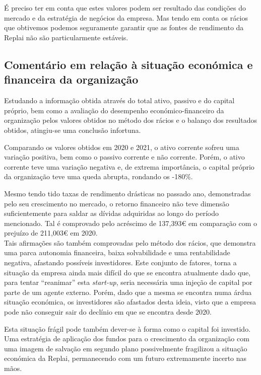 \hrulefill
\\~\\

É preciso ter em conta que estes valores podem ser resultado das condições do mercado e da estratégia de negócios da empresa. Mas tendo em conta os rácios que obtivemos podemos seguramente garantir que as fontes de rendimento da Replai não são particularmente estáveis.

\newpage
\subsection{Comentário em relação à situação económica e financeira da organização}

Estudando a informação obtida através do total ativo, passivo e do capital próprio, bem como a avaliação do desempenho económico-financeiro da organização pelos valores obtidos no método dos rácios e o balanço dos resultados obtidos, atingiu-se uma conclusão infortuna.

Comparando os valores obtidos em 2020 e 2021, o ativo corrente sofreu uma variação positiva, bem como o passivo corrente e não corrente. Porém, o ativo corrente teve uma variação negativa e, de extrema importância, o capital próprio da organização teve uma queda abrupta, rondando os -180\%.

Mesmo tendo tido taxas de rendimento drásticas no passado ano, demonstradas pelo seu crescimento no mercado, o retorno financeiro não teve dimensão suficientemente para saldar as dívidas adquiridas ao longo do período mencionado. Tal é comprovado pelo acréscimo de 137,393€ em comparação com o prejuízo de 211,003€ em 2020.\\

Tais afirmações são também comprovadas pelo método dos rácios, que demonstra uma parca autonomia financeira, baixa solvabilidade e uma rentabilidade negativa, afastando possíveis investidores. Este conjunto de fatores, torna a situação da empresa ainda mais difícil do que se encontra atualmente dado que, para tentar “reanimar” esta \textit{start-up}, seria necessária uma injeção de capital por parte de um agente externo. Porém, dado que a mesma se encontra numa árdua situação económica, os investidores são afastados desta ideia, visto que a empresa pode não conseguir sair do declínio em que se encontra desde 2020.

Esta situação frágil pode também dever-se à forma como o capital foi investido. Uma estratégia de aplicação dos fundos para o crescimento da organização com uma imagem de salvação em segundo plano possivelmente fragilizou a situação económica da Replai, permanecendo com um futuro extremamente incerto nas mãos.\\


